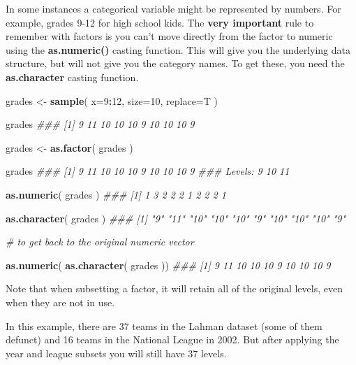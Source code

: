 \documentclass[]{book}
\newenvironment{Shaded}{\begin{snugshade}}{\end{snugshade}}
\newcommand{\CommentTok}[1]{\textcolor[rgb]{0.56,0.35,0.01}{\textit{#1}}}
\newcommand{\DataTypeTok}[1]{\textcolor[rgb]{0.13,0.29,0.53}{#1}}
\newcommand{\DecValTok}[1]{\textcolor[rgb]{0.00,0.00,0.81}{#1}}
\newcommand{\KeywordTok}[1]{\textcolor[rgb]{0.13,0.29,0.53}{\textbf{#1}}}
\newcommand{\NormalTok}[1]{#1}
\newcommand{\OperatorTok}[1]{\textcolor[rgb]{0.81,0.36,0.00}{\textbf{#1}}}
\newcommand{\StringTok}[1]{\textcolor[rgb]{0.31,0.60,0.02}{#1}}
\theoremstyle{definition}
\theoremstyle{definition}
\theoremstyle{definition}
\theoremstyle{remark}
\begin{document}
In some instances a categorical variable might be represented by
numbers. For example, grades 9-12 for high school kids. The \textbf{very
important} rule to remember with factors is you can't move directly from
the factor to numeric using the \textbf{as.numeric()} casting function.
This will give you the underlying data structure, but will not give you
the category names. To get these, you need the \textbf{as.character}
casting function.

\begin{Shaded}
\begin{Highlighting}[]

\NormalTok{grades <-}\StringTok{ }\KeywordTok{sample}\NormalTok{( }\DataTypeTok{x=}\DecValTok{9}\OperatorTok{:}\DecValTok{12}\NormalTok{, }\DataTypeTok{size=}\DecValTok{10}\NormalTok{, }\DataTypeTok{replace=}\NormalTok{T )}

\NormalTok{grades}
\CommentTok{###  [1]  9 11 10 10 10  9 10 10 10  9}

\NormalTok{grades <-}\StringTok{ }\KeywordTok{as.factor}\NormalTok{( grades )}

\NormalTok{grades}
\CommentTok{###  [1] 9  11 10 10 10 9  10 10 10 9 }
\CommentTok{### Levels: 9 10 11}

\KeywordTok{as.numeric}\NormalTok{( grades )}
\CommentTok{###  [1] 1 3 2 2 2 1 2 2 2 1}

\KeywordTok{as.character}\NormalTok{( grades )}
\CommentTok{###  [1] "9"  "11" "10" "10" "10" "9"  "10" "10" "10" "9"}

\CommentTok{# to get back to the original numeric vector}

\KeywordTok{as.numeric}\NormalTok{( }\KeywordTok{as.character}\NormalTok{( grades ))}
\CommentTok{###  [1]  9 11 10 10 10  9 10 10 10  9}
\end{Highlighting}
\end{Shaded}

Note that when subsetting a factor, it will retain all of the original
levels, even when they are not in use.

In this example, there are 37 teams in the Lahman dataset (some of them
defunct) and 16 teams in the National League in 2002. But after applying
the year and league subsets you will still have 37 levels.
\end{document}
